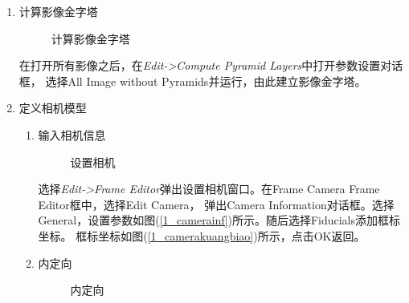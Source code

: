 \begin{enumerate}
        \item 计算影像金字塔
        
        \begin{figure}[H]
            \centering
            \caption{计算影像金字塔}
        \end{figure}

        \hspace{20pt}在打开所有影像之后，在\textit{Edit->Compute Pyramid Layers}中打开参数设置对话框，
        选择All Image without Pyramids并运行，由此建立影像金字塔。

        \item 定义相机模型
        
        \begin{enumerate}
            \item 输入相机信息
            \begin{figure}[H]
                \centering
                \caption{设置相机}
            \end{figure}

            \hspace{20pt}选择\textit{Edit->Frame Editor}弹出设置相机窗口。在Frame Camera Frame Editor框中，选择Edit Camera，
            弹出Camera Information对话框。选择General，设置参数如图(\ref{1_camerainf})所示。随后选择Fiducials添加框标坐标。
            框标坐标如图(\ref{1_camerakuangbiao})所示，点击OK返回。

            \item 内定向
            
            \begin{figure}[H]
                \centering
                \caption{内定向}
            \end{figure}


\end{enumerate}
\end{enumerate}
